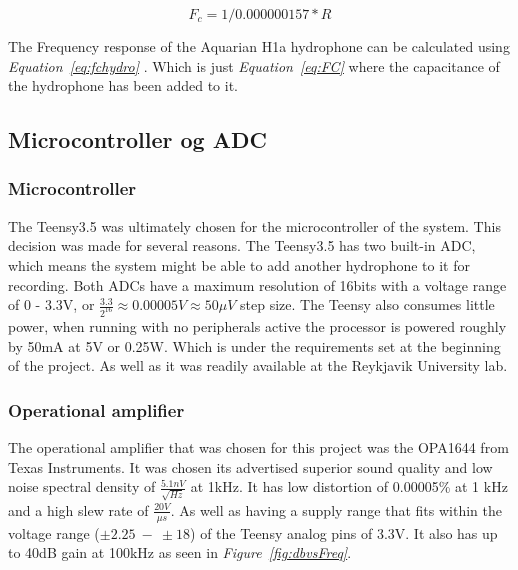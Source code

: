 \clearpage

\begin{equation}
F_c = 1 / 0.000000157 * R  
\label{eq:fchydro}
\end{equation}

The Frequency response of the Aquarian H1a hydrophone can be calculated using \textit{Equation~\ref{eq:fchydro}} \cite{noauthor_aquarian_nodate}. 
Which is just \textit{Equation~\ref{eq:FC}} where the capacitance of the hydrophone has been added to it.


\subsection{Microcontroller og ADC}

\subsubsection{Microcontroller}
The Teensy3.5 was ultimately chosen for the microcontroller of the system.
This decision was made for several reasons.
The Teensy3.5 has two built-in ADC, which means the system might be able to add another hydrophone to it for recording.
Both ADCs have a maximum resolution of 16bits with a voltage range of 0 - 3.3V, or $\frac{3.3}{2^{16}} \approx 0.00005V \approx 50\mu V$ step size.
The Teensy also consumes little power, when running with no peripherals active the processor is powered roughly by 50mA at 5V or 0.25W.
Which is under the requirements set at the beginning of the project.
As well as it was readily available at the Reykjavik University lab.

\subsubsection{Operational amplifier}

The operational amplifier that was chosen for this project was the OPA1644 from Texas Instruments.
It was chosen its advertised superior sound quality and low noise spectral density of $\frac{5.1nV}{\sqrt{Hz}}$ at 1kHz.
It has low distortion of 0.00005\% at 1 kHz and a high slew rate of $\frac{20V}{\mu s}$.
As well as having a supply range that fits within the voltage range ($\pm2.25~-~\pm18$) of the Teensy analog pins of 3.3V\cite{noauthor_opa164x_nodate}.
It also has up to 40dB gain at 100kHz as seen in \textit{Figure~\ref{fig:dbvsFreq}}.

